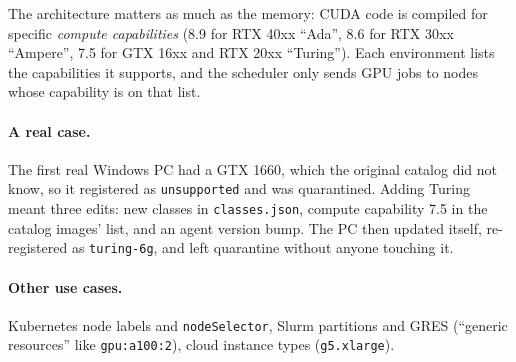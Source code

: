 The architecture matters as much as the memory: CUDA code is compiled for
specific \emph{compute capabilities} (8.9 for RTX 40xx ``Ada'', 8.6 for RTX 30xx
``Ampere'', 7.5 for GTX 16xx and RTX 20xx ``Turing''). Each environment lists
the capabilities it supports, and the scheduler only sends GPU jobs to nodes
whose capability is on that list.

\paragraph{A real case.} The first real Windows PC had a GTX 1660, which the
original catalog did not know, so it registered as \texttt{unsupported} and was
quarantined. Adding Turing meant three edits: new classes in
\texttt{classes.json}, compute capability 7.5 in the catalog images' list, and
an agent version bump. The PC then updated itself, re-registered as
\texttt{turing-6g}, and left quarantine without anyone touching it.

\paragraph{Other use cases.} Kubernetes node labels and \texttt{nodeSelector},
Slurm partitions and GRES (``generic resources'' like \texttt{gpu:a100:2}),
cloud instance types (\texttt{g5.xlarge}).
